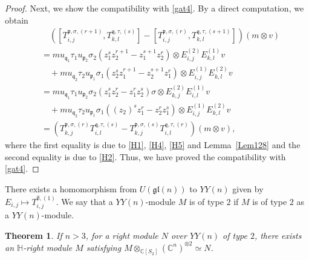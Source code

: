 \documentclass{article}
\newtheorem{Theorem}[equation]{Theorem}
\theoremstyle{definition}
\theoremstyle{remark}
\numberwithin{equation}{section}
\numberwithin{equation}{section}
\begin{document}
\begin{proof}
Next, we show the compatibility with \eqref{gat4}. By a direct computation, we obtain
\begin{align*}
&\quad([T^{\mathfrak{p},\sigma,(r+1)}_{i,j},T^{\mathfrak{q},\tau,(s)}_{k,l}]-[T^{\mathfrak{p},\sigma,(r)}_{i,j},T^{\mathfrak{q},\tau,(s+1)}_{k,l}])(m\otimes v)\\
&=mu_{\mathfrak{q}_1}\tau_1u_{\mathfrak{p}_2}\sigma_2(z_1^sz_2^{r+1}-z_1^{s+1}z_2^r)\otimes E^{(2)}_{i,j}E^{(1)}_{k,l}v\\
&\quad+mu_{\mathfrak{q}_2}\tau_2u_{\mathfrak{p}_1}\sigma_1(z_2^sz_1^{r+1}-z_2^{s+1}z_1^r)\otimes E^{(1)}_{i,j}E^{(2)}_{k,l}v\\
&=mu_{\mathfrak{q}_1}\tau_1u_{\mathfrak{p}_2}\sigma_2(z_1^sz_2^r-z_1^rz_2^s)\sigma\otimes E^{(2)}_{k,j}E^{(1)}_{i,l}v\\
&\quad+mu_{\mathfrak{q}_2}\tau_2u_{\mathfrak{p}_1}\sigma_1((z_2)^{s}z_1^r-z_2^rz_1^{s})\otimes E^{(1)}_{i,j}E^{(2)}_{k,l}v\\
&=(T^{\mathfrak{p},\sigma,(r)}_{k,j}T^{\mathfrak{q},\tau,(s)}_{i,l}-T^{\mathfrak{p},\sigma,(s)}_{k,j}T^{\mathfrak{q},\tau,(r)}_{i,l})(m\otimes v),
\end{align*}
where the first equality is due to \eqref{H1}, \eqref{H4}, \eqref{H5} and Lemma~\ref{Lem128} and the second equality is due to \eqref{H2}. Thus, we have proved the compatibility with \eqref{gat4}.
\end{proof}
There exists a homomorphism from $U(\mathfrak{gl}(n))$ to $YY(n)$ given by $E_{i,j}\mapsto T^{\emptyset,(1)}_{i,j}$. We say that a $YY(n)$-module $M$ is of type $2$ if $M$ is of type $2$ as a $YY(n)$-module.
\begin{Theorem}
If $n>3$, for a right module $N$ over $YY(n)$ of type $2$, there exists an $\mathbb{H}$-right module $M$ satisfying $M\otimes_{\mathbb{C}[S_2]}(\mathbb{C}^n)^{\otimes2}\simeq N$.
\end{Theorem}
\end{document}
